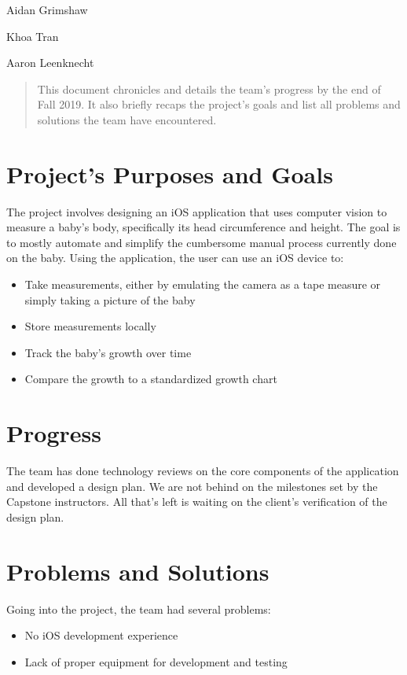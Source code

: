 \documentclass[onecolumn, draftclsnofoot,10pt, compsoc]{IEEEtran}
\def \GroupMemberOne{			Aidan Grimshaw}
\def \GroupMemberTwo{			Khoa Tran}
\def \GroupMemberThree{			Aaron Leenknecht}
\begin{document}
\begin{titlepage}
\begin{singlespace}
{{                \GroupMemberOne\par
                \GroupMemberTwo\par
                \GroupMemberThree\par
            }
            \vspace{.8in}
        }
        \begin{abstract}
            This document chronicles and details the team's progress by the end of Fall 2019. It also briefly recaps the project's goals and list all problems and solutions the team have encountered.
        \end{abstract}     
    \end{singlespace}
\end{titlepage}
\newpage
{}
\tableofcontents
\clearpage


\section{Project's Purposes and Goals}
The project involves designing an iOS application that uses computer vision to measure a baby's body, specifically its head circumference and height. The goal is to mostly automate and simplify the cumbersome manual process currently done on the baby. Using the application, the user can use an iOS device to:
\begin{itemize}
    \item Take measurements, either by emulating the camera as a tape measure or simply taking a picture of the baby
    \item Store measurements locally
    \item Track the baby's growth over time
    \item Compare the growth to a standardized growth chart
\end{itemize}

\section{Progress}
The team has done technology reviews on the core components of the application and developed a design plan. We are not behind on the milestones set by the Capstone instructors. All that's left is waiting on the client's verification of the design plan.

\section{Problems and Solutions}
Going into the project, the team had several problems:
\begin{itemize}
    \item No iOS development experience
    \item Lack of proper equipment for development and testing
\end{itemize}
\end{document}
